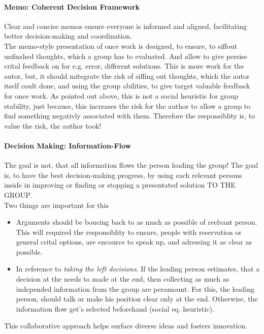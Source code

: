\paragraph{Memo: Coherent Decision Framework}
Clear and concise memos ensure everyone is informed and aligned, facilitating better decision-making and coordination.\\

The memo-style presentation of once work is designed, to ensure, to siffout unfinshed thoughts, which a group has to evaluated.
And allow to give persise crital feedback on for e.g. error, different solutions.
This is more work for the autor, but, it should mitegrate the risk of siffing out thoughts, which the autor itself coult done, and using the group abilities, to give target valuable feedback for once work.
As pointed out above, this is not a social heuristic for group stability, just because, this increases the risk for the author to allow a group to find something negativly associated with them. Therefore the responsiblity is, to value the risk, the author took!


\paragraph{Decision Making: Information-Flow}
The goal is not, that all information flows the person leading the group!
The goal is, to have the best decision-making progress, by using each relevant persons inside in improving or finding or stopping a presentated solution TO THE GROUP.\\

Two things are important for this
\begin{itemize}
	\item Arguments should be boucing back to as much as possible of reelvant person. This will required the responsiblity to ensure, people with reservation or general crital options, are encource to speak up, and adressing it as clear as possible.
	\item In reference to \textit{taking the left decisions}. If the leading person estimates, that a decision at the needs to made at the end, then collecting as much as independed information from the group are peramount. For this, the leading person, should talk or make his position clear only at the end. Otherwise, the information flow get's selected beforehand (social eq. heuristic). 
\end{itemize}

This collaborative approach helps surface diverse ideas and fosters innovation.

